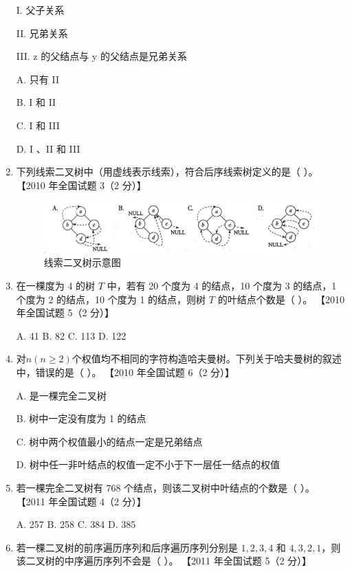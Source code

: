 \documentclass[lang=cn,newtx,10pt,scheme=chinese]{elegantbook}
\begin{document}
\begin{enumerate}
    I. 父子关系  

    II. 兄弟关系  

    III. z 的父结点与 y 的父结点是兄弟关系  

    A. 只有 II  

    B. I 和 II  

    C. I 和 III  

    D. I 、II 和 III  

    \item 下列线索二叉树中（用虚线表示线索），符合后序线索树定义的是（ ）。  
    【2010 年全国试题 3（2 分）】  

    \begin{figure}[h!]
            \centering
            \includegraphics[width=1\textwidth]{./figure/exercisePicPDF/chapter6/6-12.pdf}
            \caption{线索二叉树示意图}
    \end{figure}

    \item 在一棵度为 4 的树 $T$ 中，若有 20 个度为 4 的结点，10 个度为 3 的结点，1 个度为 2 的结点，10 个度为 1 的结点，则树 $T$ 的叶结点个数是（ ）。  
    【2010 年全国试题 5（2 分）】 

    A. 41 \quad B. 82 \quad C. 113 \quad D. 122  

    \item 对$n(n≥2)$个权值均不相同的字符构造哈夫曼树。下列关于哈夫曼树的叙述中，错误的是（ ）。  
    【2010 年全国试题 6（2 分）】  

    A. 是一棵完全二叉树  

    B. 树中一定没有度为 1 的结点  



    C. 树中两个权值最小的结点一定是兄弟结点

    D. 树中任一非叶结点的权值一定不小于下一层任一结点的权值  

    \item 若一棵完全二叉树有 768 个结点，则该二叉树中叶结点的个数是（ ）。  
    【2011 年全国试题 4（2 分）】  

    A. 257 \quad B. 258 \quad C. 384 \quad D. 385  

    \item 若一棵二叉树的前序遍历序列和后序遍历序列分别是 $1, 2, 3, 4$ 和 $4, 3, 2, 1$，则该二叉树的中序遍历序列不会是（ ）。  
    【2011 年全国试题 5（2 分）】  


\end{enumerate}
\end{document}
